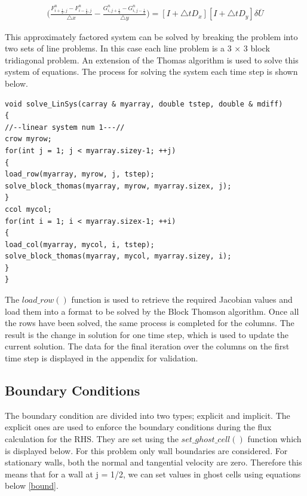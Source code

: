 \documentclass[paper=a4, fontsize=11pt, abstract=on]{scrartcl}
\numberwithin{equation}{section}		%
\numberwithin{figure}{section}			%
\numberwithin{table}{section}				%
\begin{document}
 \begin{equation}
  \begin{aligned}
\Bigg( \frac{F_{i+\frac{1}{2},j}^n-F_{i-\frac{1}{2},j}^n}{\triangle x} - \frac{G_{i, j+\frac{1}{2}}^n-G_{i,j-\frac{1}{2}}^n}{\triangle y}\Bigg)
= [I+\triangle t D_x][I + \triangle t D_y]\delta \overline U
\end{aligned}
\label{m2} 
\end{equation}

This approximately factored system can be solved by breaking the problem into two sets of line problems. In this case each line problem is a 3 × 3 block tridiagonal problem. An extension of the Thomas algorithm is used to solve this system of equations. The process for solving the system each time step is shown below.


\begin{lstlisting}
void solve_LinSys(carray & myarray, double tstep, double & mdiff)
{
//--linear system num 1---//
crow myrow;
for(int j = 1; j < myarray.sizey-1; ++j)
{
load_row(myarray, myrow, j, tstep);
solve_block_thomas(myarray, myrow, myarray.sizex, j);
}
ccol mycol;
for(int i = 1; i < myarray.sizex-1; ++i)
{
load_col(myarray, mycol, i, tstep);
solve_block_thomas(myarray, mycol, myarray.sizey, i);
}
}

\end{lstlisting}

The $load\_row()$ function is used to retrieve the required Jacobian values and load them into a format to be solved by the Block Thomson algorithm. Once all the rows have been solved, the same process is completed for the columns. The result is the change in solution for one time step, which is used to update the current solution. The data for the final iteration over the columns on the first time step is displayed in the appendix for validation.

\subsection{Boundary Conditions}
The boundary condition are divided into two types; explicit and implicit. The explicit ones are used to enforce the boundary conditions during the flux calculation for the RHS. They are set using the $set\_ghost\_cell()$ function which is displayed below. For this problem only wall boundaries are considered. For stationary walls, both the normal and tangential velocity are zero. Therefore  this means that for a wall at j = 1/2, we can set values in ghost cells using equations below \ref{bound}.
\end{document}
